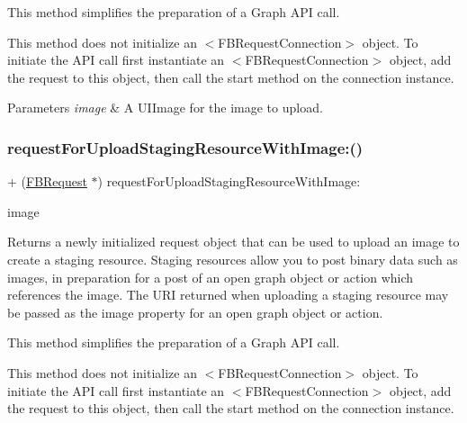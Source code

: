This method simplifies the preparation of a Graph A\+PI call.

This method does not initialize an $<$\+F\+B\+Request\+Connection$>$ object. To initiate the A\+PI call first instantiate an $<$\+F\+B\+Request\+Connection$>$ object, add the request to this object, then call the {\ttfamily start} method on the connection instance.


\begin{DoxyParams}{Parameters}
{\em image} & A {\ttfamily U\+I\+Image} for the image to upload. \\
\hline
\end{DoxyParams}
\mbox{\label{interfaceFBRequest_a4a85038bef70a9edd91a56ab0db0bfd6}} 
\subsubsection{\texorpdfstring{request\+For\+Upload\+Staging\+Resource\+With\+Image\+:()}{requestForUploadStagingResourceWithImage:()}\hspace{0.1cm}{\footnotesize\ttfamily [2/5]}}
{\footnotesize\ttfamily + (\hyperlink{interfaceFBRequest}{F\+B\+Request} $\ast$) request\+For\+Upload\+Staging\+Resource\+With\+Image\+: \begin{DoxyParamCaption}\item[{(U\+I\+Image $\ast$)}]{image }\end{DoxyParamCaption}}

Returns a newly initialized request object that can be used to upload an image to create a staging resource. Staging resources allow you to post binary data such as images, in preparation for a post of an open graph object or action which references the image. The U\+RI returned when uploading a staging resource may be passed as the image property for an open graph object or action.

This method simplifies the preparation of a Graph A\+PI call.

This method does not initialize an $<$\+F\+B\+Request\+Connection$>$ object. To initiate the A\+PI call first instantiate an $<$\+F\+B\+Request\+Connection$>$ object, add the request to this object, then call the {\ttfamily start} method on the connection instance.


